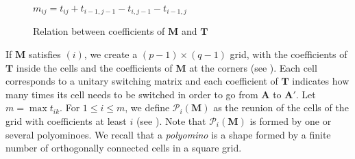 \documentclass{article}
\renewcommand{\P}{\mathcal P}
\newcommand{\A}{\mathbf A}
\newcommand{\M}{\mathbf M}
\newcommand{\T}{\mathbf T}
\begin{document}
\begin{figure}[ht]
    \begin{center}
    
    \medskip
    
    $m_{ij}=t_{ij}+t_{i-1,j-1}-t_{i,j-1}-t_{i-1,j}$
    \end{center}
    \caption{Relation between coefficients of $\M$ and $\T$}
    \label{fig.mij}
\end{figure}




If $\M$ satisfies $(i)$, we create a $(p-1)\times(q-1)$ grid, with the coefficients of $\T$ inside the cells and the coefficients of $\M$ at the corners (see ). Each cell corresponds to a unitary switching matrix and each coefficient of $\T$ indicates how many times its cell needs to be switched in order to go from $\A$ to $\A'$. Let $m=\max t_{ik}$. For $1\leq i\leq m$, we define $\P_i(\M)$ as the reunion of the cells of the grid with coefficients at least $i$ (see ). Note that $\P_i(\M)$ is formed by one or several polyominoes. We recall that a \emph{polyomino} is a shape formed by a finite number of orthogonally connected cells in a square grid.
\end{document}
